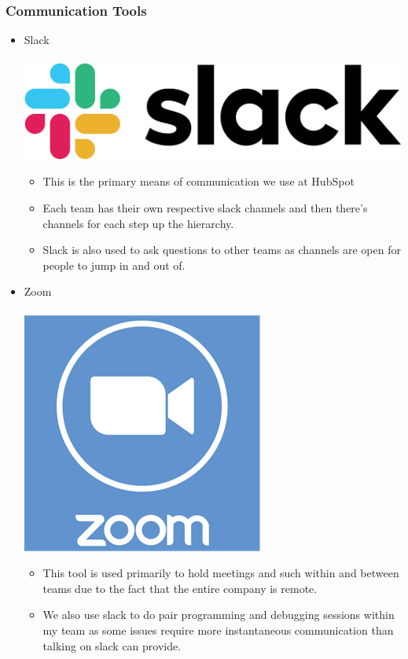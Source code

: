 \documentclass[11pt]{article} %
\begin{document}
\subsubsection{\textbf{Communication Tools}}
\begin{itemize}
\item Slack\\\\
\includegraphics[scale=0.07]{slack.png}
\begin{itemize}
\item This is the primary means of communication we use at HubSpot
\item Each team has their own respective slack channels and then there's channels for each step up the hierarchy.
\item Slack is also used to ask questions to other teams as channels are open for people to jump in and out of.
\end{itemize}
\item Zoom\\\\
\includegraphics[scale=0.2]{zoom.png}
\begin{itemize}
\item This tool is used primarily to hold meetings and such within and between teams due to the fact that the entire company is remote.
\item We also use slack to do pair programming and debugging sessions within my team as some issues require more instantaneous communication than talking on slack can provide.

\end{itemize}
\end{itemize}
\end{document}
